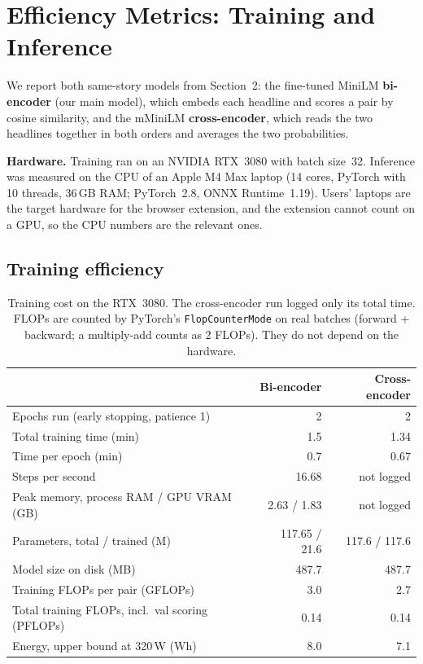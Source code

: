 
\section{Efficiency Metrics: Training and Inference}
\label{sec:efficiency}

We report both same-story models from Section~2: the fine-tuned MiniLM \textbf{bi-encoder} (our main model), which embeds each headline and scores a pair by cosine similarity, and the mMiniLM \textbf{cross-encoder}, which reads the two headlines together in both orders and averages the two probabilities.

\textbf{Hardware.} Training ran on an NVIDIA RTX~3080 with batch size~32. Inference was measured on the CPU of an Apple M4 Max laptop (14 cores, PyTorch with 10 threads, 36\,GB RAM; PyTorch~2.8, ONNX Runtime~1.19). Users' laptops are the target hardware for the browser extension, and the extension cannot count on a GPU, so the CPU numbers are the relevant ones.

\subsection{Training efficiency}

\begin{table}[H]
\centering
\caption{Training cost on the RTX~3080. The cross-encoder run logged only its total time. FLOPs are counted by PyTorch's \texttt{FlopCounterMode} on real batches (forward + backward; a multiply-add counts as 2 FLOPs). They do not depend on the hardware.}
\label{tab:train-eff}
\small
\begin{tabular}{@{}lrr@{}}
\toprule
 & Bi-encoder & Cross-encoder \\
\midrule
Epochs run (early stopping, patience 1) & 2 & 2 \\
Total training time (min) & 1.5 & 1.34 \\
Time per epoch (min) & 0.7 & 0.67 \\
Steps per second & 16.68 & not logged \\
Peak memory, process RAM / GPU VRAM (GB) & 2.63 / 1.83 & not logged \\
Parameters, total / trained (M) & 117.65 / 21.6 & 117.6 / 117.6 \\
Model size on disk (MB) & 487.7 & 487.7 \\
Training FLOPs per pair (GFLOPs) & 3.0 & 2.7 \\
Total training FLOPs, incl.\ val scoring (PFLOPs) & 0.14 & 0.14 \\
Energy, upper bound at 320\,W (Wh) & 8.0 & 7.1 \\
\bottomrule
\end{tabular}
\end{table}

